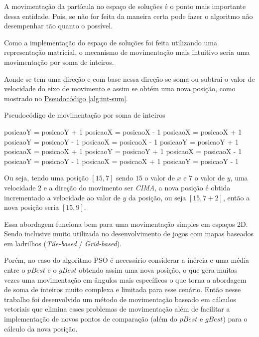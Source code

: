 A movimentação da partícula no espaço de soluções é o ponto mais importante dessa entidade. Pois, se não for feita da maneira certa pode fazer o algoritmo não desempenhar tão quanto o possível.


Como a implementação do espaço de soluções foi feita utilizando uma representação matricial, o mecanismo de movimentação mais intuitivo seria uma movimentação por soma de inteiros.


Aonde se tem uma direção e com base nessa direção se soma ou subtrai o valor de velocidade do eixo de movimento e assim se obtém uma nova posição, como mostrado no \hyperref[alg:int-sum]{Pseudocódigo \ref{alg:int-sum}}.
\begin{algorithm}
    \caption{Pseudocódigo de movimentação por soma de inteiros}\label{alg:int-sum}
\begin{algorithmic}
  \State posicaoY = posicaoY + 1
  \State posicaoX = posicaoX - 1
  \State posicaoX = posicaoX + 1
  \State posicaoY = posicaoY - 1
  \State posicaoX = posicaoX - 1
  \State posicaoY = posicaoY + 1
  \State posicaoX = posicaoX + 1
  \State posicaoY = posicaoY + 1
  \State posicaoX = posicaoX - 1
  \State posicaoY = posicaoY - 1
  \State posicaoX = posicaoX + 1
  \State posicaoY = posicaoY - 1
\EndIf    
\end{algorithmic}
\end{algorithm}


Ou seja, tendo uma posição $[15, 7]$ sendo $15$ o valor de $x$ e $7$ o valor de $y$,
uma velocidade $2$ e a direção do movimento ser \textit{CIMA}, a nova posição é obtida incrementado a velocidade ao valor de $y$ da posição, ou seja $[15, 7+2]$, então a nova posição seria $[15, 9]$.


Essa abordagem funciona bem para uma movimentação simples em espaços 2D. Sendo inclusive muito utilizada no desenvolvimento de jogos com mapas baseados em ladrilhos (\textit{Tile-based} / \textit{Grid-based}).


Porém, no caso do algoritmo PSO é necessário considerar a inércia e uma média entre o $pBest$ e o $gBest$ obtendo assim uma nova posição, o que gera muitas vezes uma movimentação em ângulos mais específicos o que torna a abordagem de soma de inteiros muito complexa e limitada para esse cenário.
Então nesse trabalho foi desenvolvido um método de movimentação baseado em cálculos vetoriais que elimina esses problemas de movimentação além de facilitar a implementação de novos pontos de comparação (além do $pBest$ e $gBest$) para o cálculo da nova posição.


